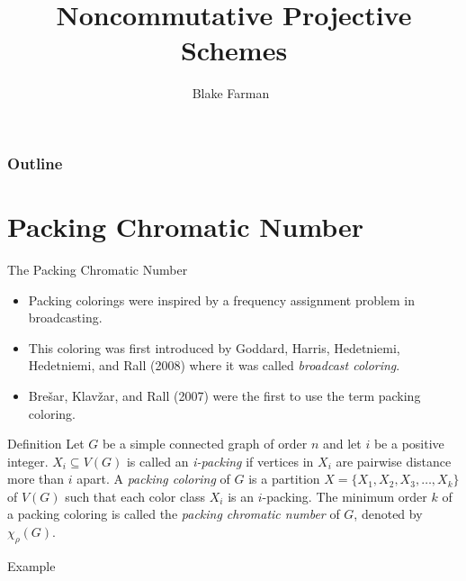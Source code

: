 \documentclass{beamer}
\title %
{Noncommutative Projective Schemes}
\author[Clifton]
{Blake Farman~\inst{1}}
\institute[USC]{
\inst{1}
University of South Carolina, Columbia, SC USA}
\date[May 28, 2015]
\begin{document}
\begin{frame}
  \titlepage
\end{frame}

\begin{frame}
  \frametitle{Outline}
  \tableofcontents[pausesections]
\end{frame}




\section{Packing Chromatic Number}

\begin{frame}{The Packing Chromatic Number}
\begin{itemize}
\item  Packing colorings were inspired by a frequency assignment problem in broadcasting.
\item This coloring was first introduced by Goddard, Harris, Hedetniemi, Hedetniemi, and Rall (2008) where it was called {\it{broadcast coloring}}.
\item Bre\v sar, Klav\v zar, and Rall (2007) were the first to use the term packing coloring.
\end{itemize}
\end{frame}

\begin{frame}{Definition}
Let $G$ be a simple connected graph of order $n$ and let $i$ be a positive integer.  $X_i\subseteq V(G)$ is called an \alert{{\it{i-packing}}} if vertices in $X_i$ are pairwise distance more than $i$ apart.  A \alert{{\it{packing coloring}}} of $G$ is a partition $X=\{X_1,X_2,X_3,\ldots,X_k \}$ of $V(G)$ such that each color class $X_i$ is an $i$-packing.  The minimum order $k$ of a packing coloring is called the \alert{{\it{packing chromatic number}}} of $G$, denoted by $\chi_{\rho}(G)$.  
\end{frame}

\begin{frame}{Example}
\end{frame}
\end{document}
